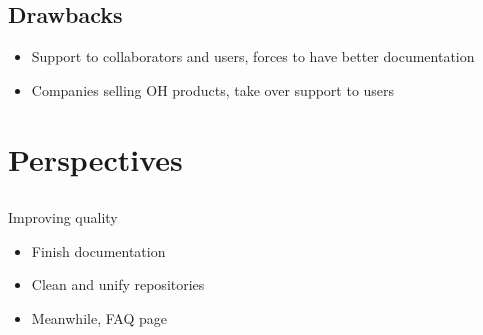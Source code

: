 \documentclass[compress,red]{beamer}
\begin{document}
\subsection{Drawbacks} %

\begin{frame}{}

  \begin{block}{}
    \begin{itemize}
    \item Support to collaborators and users, forces to have better documentation
    \item Companies selling OH products, take over support to users
    \end{itemize}
  \end{block}

\end{frame}


\section{Perspectives}

\subsection*{} %

\begin{frame}{Improving quality}

  \begin{block}{}
    \begin{itemize}
    \item Finish documentation
    \item Clean and unify repositories
    \item Meanwhile, FAQ page
    \end{itemize}
  \end{block}

\end{frame}
\end{document}
